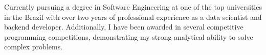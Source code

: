 \documentclass[a4paper,12pt]{article}
\begin{document}

Currently pursuing a degree in Software Engineering at one of the top universities in the Brazil
with over two years of professional experience as a data scientist and backend developer.
Additionally, I have been awarded in several competitive programming competitions, demonstrating my strong
analytical ability to solve complex problems.
\end{document}
